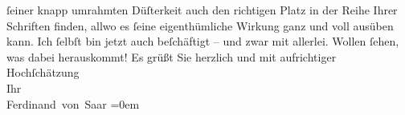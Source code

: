 \begin{ledgroupsized}[t]{13cm}
                    ſeiner knapp umrahmten Düſterkeit \introOben{}auch\introOben{} den richtigen
                    Platz in der Reihe Ihrer Schriften finden, allwo es ſeine eigenthümliche Wirkung
                    ganz und voll ausüben kann.\pend
           \pstart
           Ich ſelbſt bin jetzt auch beſchäftigt – und zwar mit allerlei. Wollen ſehen, was
                    dabei herauskommt!\pend
           \pstart
           Es grüßt Sie herzlich und mit aufrichtiger
                        Hochſchätzung{\\[\baselineskip]}Ihr{\\[\baselineskip]}\spacefill\mbox{Ferdinand von Saar}\pend
           \leftskip=0em{}
         
         \endnumbering{}\end{ledgroupsized}  \newcommand{\dateiname}{L00410}\newcommand{\titel}{Ferdinand von Saar an Arthur Schnitzler, 13. 12. 1894}\newcommand{\editorInnen}{Martin Anton Müller und Gerd-Hermann Susen}
      